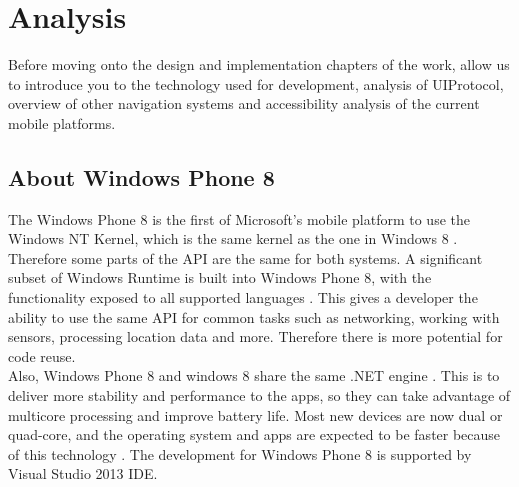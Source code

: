 \chapter{Analysis}
Before moving onto the design and implementation chapters of the work, allow us to introduce you to the technology used for development, analysis of UIProtocol, overview of other navigation systems and accessibility analysis of the current mobile platforms.


\section{About Windows Phone 8}
The Windows Phone 8 is the first of Microsoft's mobile platform to use the Windows NT Kernel, which is the same kernel as the one in Windows 8 \cite{wp8kernel}. Therefore some parts of the API are the same for both systems. A significant subset of Windows Runtime is built into Windows Phone 8, with the functionality exposed to all supported languages \cite{wp8comparison}. This gives a developer the ability to use the same API for common tasks such as networking, working with sensors, processing location data and more. Therefore there is more potential for code reuse.\\
Also, Windows Phone 8 and windows 8 share the same .NET engine \cite{wp8comparison}. This is to deliver more stability and performance to the apps, so they can take advantage of multicore processing and improve battery life. Most new devices are now dual or quad-core, and the operating system and apps are expected to be faster because of this technology \cite{wp8comparison}. The development for Windows Phone 8 is supported by Visual Studio 2013 IDE.

